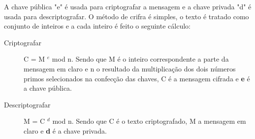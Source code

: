 %
A chave pública "e" é usada para criptografar a mensagem e a chave privada "d" é usada para descriptografar. O método de crifra é simples, o texto é tratado como conjunto de inteiros e a cada inteiro é feito o seguinte cálculo:

\begin{description}
\item [Criptografar]
C = M $^ e$ mod n. Sendo que M é o inteiro correspondente a parte da mensagem em claro e n o resultado da multiplicação dos dois números primos selecionados na confecção  das chaves, C é a mensagem cifrada e \textbf{e} é a chave pública. 
\item [Descriptografar]
M = C $^ d$ mod n. Sendo que C é o texto criptografado, M a mensagem em claro e \textbf{d} é a chave privada.
\end{description}

%